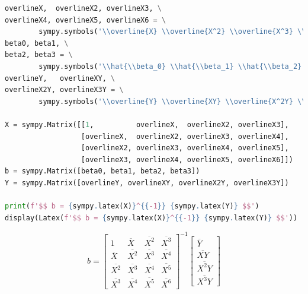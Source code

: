 \documentclass[a4paper, 14pt]{extarticle}
\begin{document}
\begin{center}
    \begin{lstlisting}[language=Python]
overlineX,  overlineX2, overlineX3, \
overlineX4, overlineX5, overlineX6 = \
        sympy.symbols('\\overline{X} \\overline{X^2} \\overline{X^3} \\overline{X^4} \\overline{X^5} \\overline{X^6}')
beta0, beta1, \
beta2, beta3 = \
        sympy.symbols('\\hat{\\beta_0} \\hat{\\beta_1} \\hat{\\beta_2} \\hat{\\beta_3}')
overlineY,   overlineXY, \
overlineX2Y, overlineX3Y = \
        sympy.symbols('\\overline{Y} \\overline{XY} \\overline{X^2Y} \\overline{X^3Y}')

X = sympy.Matrix([[1,          overlineX,  overlineX2, overlineX3], 
                  [overlineX,  overlineX2, overlineX3, overlineX4],
                  [overlineX2, overlineX3, overlineX4, overlineX5],
                  [overlineX3, overlineX4, overlineX5, overlineX6]])
b = sympy.Matrix([beta0, beta1, beta2, beta3])
Y = sympy.Matrix([overlineY, overlineXY, overlineX2Y, overlineX3Y])

print(f'$$ b = {sympy.latex(X)}^{{-1}} {sympy.latex(Y)} $$')
display(Latex(f'$$ b = {sympy.latex(X)}^{{-1}} {sympy.latex(Y)} $$'))
    \end{lstlisting}
\end{center}

\begin{equation*}
    b = \left[\begin{matrix}1 & \overline{X} & \overline{X^2} & \overline{X^3}\\\overline{X} & \overline{X^2} & \overline{X^3} & \overline{X^4}\\\overline{X^2} & \overline{X^3} & \overline{X^4} & \overline{X^5}\\\overline{X^3} & \overline{X^4} & \overline{X^5} & \overline{X^6}\end{matrix}\right]^{-1} \left[\begin{matrix}\overline{Y}\\\overline{XY}\\\overline{X^2Y}\\\overline{X^3Y}\end{matrix}\right]
\end{equation*}
\end{document}
